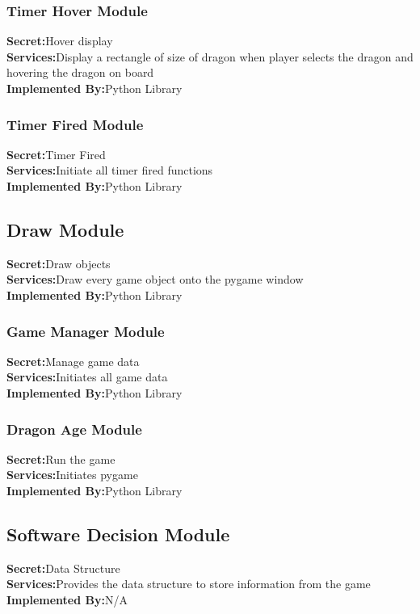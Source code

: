\documentclass{article}
\begin{document}
\subsubsection{Timer Hover Module}
\textbf{Secret:}Hover display\\
\textbf{Services:}Display a rectangle of size of dragon when player selects the dragon and hovering the dragon on board\\
\textbf{Implemented By:}Python Library\\

\subsubsection{Timer Fired Module}
\textbf{Secret:}Timer Fired\\
\textbf{Services:}Initiate all timer fired functions\\
\textbf{Implemented By:}Python Library\\

\subsection{Draw Module}
\textbf{Secret:}Draw objects\\
\textbf{Services:}Draw every game object onto the pygame window\\
\textbf{Implemented By:}Python Library\\

\subsubsection{Game Manager Module}
\textbf{Secret:}Manage game data\\
\textbf{Services:}Initiates all game data\\
\textbf{Implemented By:}Python Library\\

\subsubsection{Dragon Age Module}
\textbf{Secret:}Run the game\\
\textbf{Services:}Initiates pygame\\
\textbf{Implemented By:}Python Library\\

\subsection{Software Decision Module}
\textbf{Secret:}Data Structure\\
\textbf{Services:}Provides the data structure to store information from the game\\
\textbf{Implemented By:}N/A\\
\end{document}
